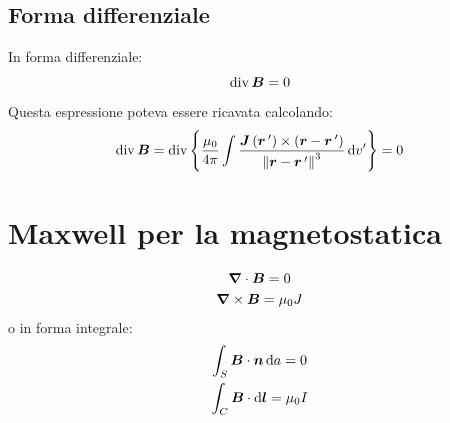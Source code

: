 \subsection{Forma differenziale}
In forma differenziale:
\begin{equation}
  \operatorname{div}\boldsymbol{B}=0
\end{equation}
Questa espressione poteva essere ricavata calcolando:
\[\operatorname{div}\boldsymbol{B}=\operatorname{div} \left\{\frac{\mu_0}{4\pi}\int\frac{\boldsymbol{J}\left(\boldsymbol{r}\,'\right)\times\left(\boldsymbol{r}-\boldsymbol{r}\,'\right)}{\left\lVert\boldsymbol{r}-\boldsymbol{r}\,'\right\rVert^3}\,\mathrm{d} v'\right\}=0\]
\section{Maxwell per la magnetostatica}
\begin{gather}
  \boldsymbol{\nabla}\cdot\boldsymbol{B}=0\\
  \boldsymbol{\nabla}\times\boldsymbol{B}=\mu_0 J
\end{gather}
o in forma integrale:
\begin{gather}
  \int_S\boldsymbol{B}\cdot\boldsymbol{n}\,\mathrm{d} a=0\\
  \int_C\boldsymbol{B}\cdot\mathrm{d} \boldsymbol{l}=\mu_0 I
\end{gather}
